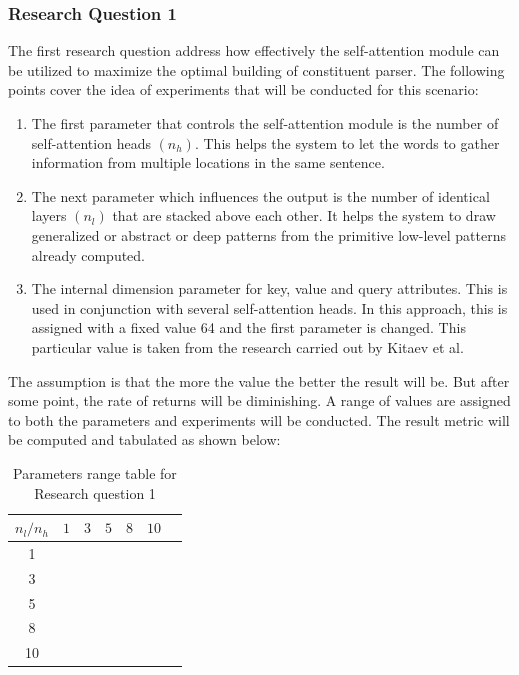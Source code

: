 \documentclass[a4paper, 11pt]{article}
\begin{document}
\subsubsection{Research Question 1}
The first research question address how effectively the self-attention module can be utilized to maximize the optimal building of constituent parser. The following points cover the idea of experiments that will be conducted for this scenario:
\begin{enumerate}
\item The first parameter that controls the self-attention module is the number of self-attention heads $(n_h)$. This helps the system to let the words to gather information from multiple locations in the same sentence. 
\item The next parameter which influences the output is the number of identical layers $(n_l)$ that are stacked above each other. It helps the system to draw generalized or abstract or deep patterns from the primitive low-level patterns already computed. 
\item The internal dimension parameter for key, value and query attributes. This is used in conjunction with several self-attention heads. In this approach, this is assigned with a fixed value 64 and the first parameter is changed. This particular value is taken from the research carried out by Kitaev et al. \parencite*{Kitaev2019}
\end{enumerate}

The assumption is that the more the value the better the result will be. But after some point, the rate of returns will be diminishing. A range of values are assigned to both the parameters and experiments will be conducted. The result metric will be computed and tabulated as shown below:

\begin{table}[h!]
  \begin{center}
    \begin{tabular}{c|c|c|c|c|c|c} 
      $n_l/n_h$ & $1$ & $3$ & $5$ & $8$ & $10$\\
      \hline
      1 & & & & & & \\
      \hline
      3 & & & & & \\
      \hline
      5 & & & & & \\
      \hline
      8 & & & & & \\
      \hline
      10 & & & & & \\
    \end{tabular}
    \caption{Parameters range table for Research question 1}
    \label{tab:research_question1_table1}

  \end{center}
\end{table}
\end{document}
